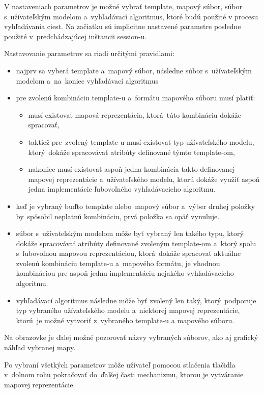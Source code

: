 \documentclass[12pt,a4paper]{report}
\begin{document}
V nastaveniach parametrov je možné vybrať template, mapový súbor, súbor s~užívateľským modelom a~vyhľadávací algoritmus, ktoré budú použité v procesu vyhľadávania ciest. Na začiatku sú implicitne nastavené parametre posledne použité v~predchádzajúcej inštancii session-u.

Nastavovanie parametrov sa riadi určitými pravidlami:
\begin{itemize}
    \item najprv sa vyberá template a~mapový súbor, následne súbor s~užívateľským modelom a~na~koniec vyhľadávací algoritmus
    \item pre zvolenú kombináciu template-u a~formátu mapového súboru musí platiť:
    \begin{itemize}
        \item musí existovať mapová reprezentácia, ktorá~túto kombináciu dokáže spracovať,
        \item taktiež pre~zvolený template-u musí existovať typ užívateľského modelu, ktorý~dokáže spracovávať atribúty definované týmto template-om,
        \item nakoniec musí existovať aspoň jedna kombinácia takto definovanej mapovej reprezentácie a~užívateľského modelu, ktorú dokáže využiť aspoň jedna implementácie ľubovoľného vyhľadávacieho algoritmu.
    \end{itemize}
    \item keď je vybraný buďto template alebo~mapový súbor a~výber druhej položky by~spôsobil neplatnú kombináciu, prvá položka sa opäť vynuluje.
    \item súbor s~užívateľským modelom môže byť vybraný len takého typu, ktorý dokáže spracovávať atribúty definované zvoleným template-om a~ktorý spolu s~ľubovoľnou mapovou reprezentáciou, ktorá~dokáže spracovať aktuálne zvolenú kombináciu template-u a~mapového formátu, je vhodnou kombináciou pre aspoň jednu implementáciu nejakého vyhľadávacieho algoritmu.
    \item vyhľadávací algoritmus následne môže byť zvolený len taký, ktorý~podporuje typ vybraného užívateľského modelu a~niektorej mapovej reprezentácie, ktorú~je možné vytvoriť z~vybraného template-u a mapového súboru.
\end{itemize}

Na obrazovke je ďalej možné pozorovať názvy vybraných súborov, ako aj grafický náhľad vybranej mapy.

Po vybraní všetkých parametrov môže užívateľ pomocou stlačenia tlačidla v~dolnom rohu pokračovať do~ďalšej časti mechanizmu, ktorou je vytváranie mapovej reprezentácie.
\end{document}
